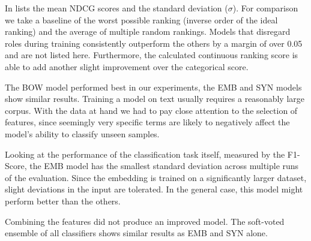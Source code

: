 In  lists the mean NDCG scores and the standard deviation ($\sigma$).
For comparison we take a baseline of the worst possible ranking (inverse order of the ideal ranking) and the average of multiple random rankings.
Models that disregard roles during training consistently outperform the others by a margin of over 0.05 and are not listed here.
Furthermore, the calculated continuous ranking score is able to add another slight improvement over the categorical score.

The BOW model performed best in our experiments, the EMB and SYN models show similar results. 
Training a model on text usually requires a reasonably large corpus.
With the data at hand we had to pay close attention to the selection of features, since seemingly very specific terms are likely to negatively affect the model's ability to classify unseen samples.

Looking at the performance of the classification task itself, measured by the F1-Score, the EMB model has the smallest standard deviation across multiple runs of the evaluation.
Since the embedding is trained on a significantly larger dataset, slight deviations in the input are tolerated.
In the general case, this model might perform better than the others.

Combining the features did not produce an improved model. The soft-voted ensemble of all classifiers shows similar results as EMB and SYN alone.


%


